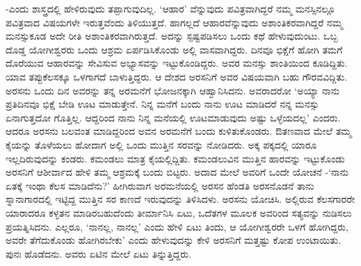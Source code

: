 -ಎಂದು ಶಾಸ್ತ್ರದಲ್ಲಿ ಹೇಳಿರುವುದು ತಪ್ಪಾಗುವುದಿಲ್ಲ. `ಆಹಾರ' ವೆನ್ನುವುದು ಪವಿತ್ರವಾಗಿದ್ದರೆ ನಮ್ಮ ಮನಸ್ಸಿನಲ್ಲೂ ಪವಿತ್ರವಾದ ವಿಷಯಗಳೇ ಇರುತ್ತವೆಂದು ತಿಳಿಯುತ್ತದೆ. ಹಾಗಲ್ಲದೆ ಆಹಾರವೆನ್ನುವುದು ಅಶಾಂತಿಕರವಾಗಿದ್ದರೆ ನಮ್ಮ ಮನಸ್ಸುಕೂಡ ಅದೇ ರೀತಿ ಅಶಾಂತಿಕರವಾಗಿರುತ್ತದೆ. ಅದನ್ನು ಸ್ಪಷ್ಟಪಡಿಸಲು ಒಂದು ಕಥೆ ಹೇಳುವುದುಂಟು. ಒಬ್ಬ ದೊಡ್ಡ ಯೋಗೀಶ್ವರರು ಒಂದು ಆಶ್ರಮ ಏರ್ಪಡಿಸಿಕೊಂಡು ಅಲ್ಲಿ ವಾಸವಾಗಿದ್ದರು. ದಿನವೂ ಭಿಕ್ಷೆಗೆ ಹೋಗಿ ತಮಗೆ ದೊರೆಯುವ ಆಹಾರವನ್ನು ಸೇವಿಸುವ ಅಭ್ಯಾಸವನ್ನು ಇಟ್ಟುಕೊಂಡಿದ್ದರು. ಅವರ ಮನಸ್ಸು ಶಾಂತಿಯಿಂದ ಕೂಡಿದ್ದಿತು. ಯಾವ ತಪ್ಪುಕೆಲಸಕ್ಕೂ ಒಳಗಾಗದೆ ಬಾಳುತ್ತಿದ್ದರು. ಆ ದೇಶದ ಅರಸನಿಗೆ ಅವರ ವಿಷಯವಾಗಿ ಬಹು ಗೌರವವಿದ್ದಿತು. ಅರಸನು ಒಂದು ದಿನ ಅವರನ್ನು ತನ್ನ ಅರಮನೆಗೆ ಭೋಜನಕ್ಕಾಗಿ ಆಹ್ವಾನಿಸಿದನು. ಅವರಾದರೋ `ಅಯ್ಯಾ ನಾನು ಪ್ರತಿದಿನವೂ ಭಿಕ್ಷೆ ಬೇಡಿ ಊಟ ಮಾಡುತ್ತೇನೆ. ನಿನ್ನ ಮನೆಗೆ ಬಂದು ನಾನು ಊಟ ಮಾಡಿದರೆ ನನ್ನ ಮನಸ್ಸು ಏನಾಗುತ್ತದೋ ಗೊತ್ತಿಲ್ಲ. ಆದ್ದರಿಂದ ನಾನು ನಿನ್ನ ಮನೆಯಲ್ಲಿ ಊಟಮಾಡುವುದು ಅಷ್ಟು  ಒಳ್ಳೆಯದಲ್ಲ' ಎಂದರು. ಆದರೂ ಅರಸನು ಬಲವಂತ ಮಾಡಿದ್ದರಿಂದ ಅವನ ಅರಮನೆಗೆ ಬಂದು ಕುಳಿತುಕೊಂಡರು. ಔತಣವಾದ ಮೇಲೆ ತಮ್ಮ ಕೈಯನ್ನು ತೊಳೆಯಲು ಹೋದಾಗ ಅಲ್ಲಿ ಒಂದು ಮುತ್ತಿನ ಸರವನ್ನು ನೋಡಿದರು. ಅಕ್ಕ ಪಕ್ಕದಲ್ಲಿ ಯಾರೂ ಇಲ್ಲದಿರುವುದನ್ನು ಕಂಡರು. ಕಮಂಡಲು ಮಾತ್ರ ಕೈಯಲ್ಲಿದ್ದಿತು. ಕಮಂಡಲುವಿನ ಮುತ್ತಿನ ಹಾರವನ್ನು ಇಟ್ಟುಕೊಂಡು ಅರಸನಿಗೆ ಆಶೀರ್ವಾದ ಹೇಳಿ ತಮ್ಮ ಆಶ್ರಮಕ್ಕೆ ಬಂದು ಬಿಟ್ಟರು. ಅದಾದ ಮೇಲೆ ಅವರಿಗೆ ಒಂದೇ ಯೋಚನೆ -`ನಾನು ಏತಕ್ಕೆ ಇಂಥಾ ಕೆಲಸ ಮಾಡಿದೆನು?' ಹೀಗಿರುವಾಗ ಅರಮನೆಯಲ್ಲಿ ಅರಸನ ಹೆಂಡತಿ ಅರಸನೊಡನೆ ತಾನು ಸ್ನಾನಾಗಾರದಲ್ಲಿ ಇಟ್ಟಿದ್ದ ಮುತ್ತಿನ ಸರ ಕಾಣದೆ ಇರುವುದನ್ನು ತಿಳಿಸಿದಳು. ಅರಸನು ಯೋಚಿಸಿ. ಅಲ್ಲಿರುವ ಕೆಲಸಗಾರರೇ ಯಾರಾದರೂ ಕಳ್ಳತನ ಮಾಡಿರಬಹುದೆಂದು ತೀರ್ಮಾನಿಸಿ ಏಟು, ಒದೆತಗಳ ಮೂಲಕ ಅವರಿಂದ ಸತ್ಯವನ್ನು ನುಡಿಸಲು ಪ್ರಯತ್ನಿಸಿದನು. ಎಲ್ಲರೂ, `ನಾನಲ್ಲ, ನಾನಲ್ಲ' ಎಂದು ಹೇಳಿ ಏಟು ತಿಂದು, ಆ ಯೋಗೀಶ್ವರರೇ ಒಳಗೆ ಹೋಗಿದ್ದರು, ಅವರೇ ತೆಗೆದುಕೊಂಡು ಹೋಗಿರಬೇಕು' ಎಂದು ಹೇಳುವುದನ್ನು ಕೇಳಿ ಅರಸನಿಗೆ ಮತ್ತಷ್ಟು ಕೋಪ ಉಂಟಾಯಿತು. ಪುನಃ ಹೊಡೆದನು. ಅವರು ಏಟಿನ ಮೇಲೆ ಏಟು ತಿನ್ನುತ್ತಿದ್ದರು.

